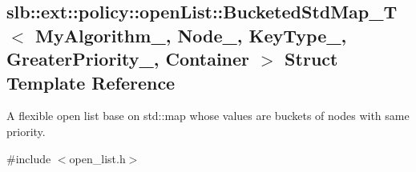 \hypertarget{structslb_1_1ext_1_1policy_1_1openList_1_1BucketedStdMap__T}{}\subsection{slb\+:\+:ext\+:\+:policy\+:\+:open\+List\+:\+:Bucketed\+Std\+Map\+\_\+T$<$ My\+Algorithm\+\_\+, Node\+\_\+, Key\+Type\+\_\+, Greater\+Priority\+\_\+, Container $>$ Struct Template Reference}
\label{structslb_1_1ext_1_1policy_1_1openList_1_1BucketedStdMap__T}


A flexible open list base on {\ttfamily std\+::map} whose values are buckets of nodes with same priority.  




{\ttfamily \#include $<$open\+\_\+list.\+h$>$}

